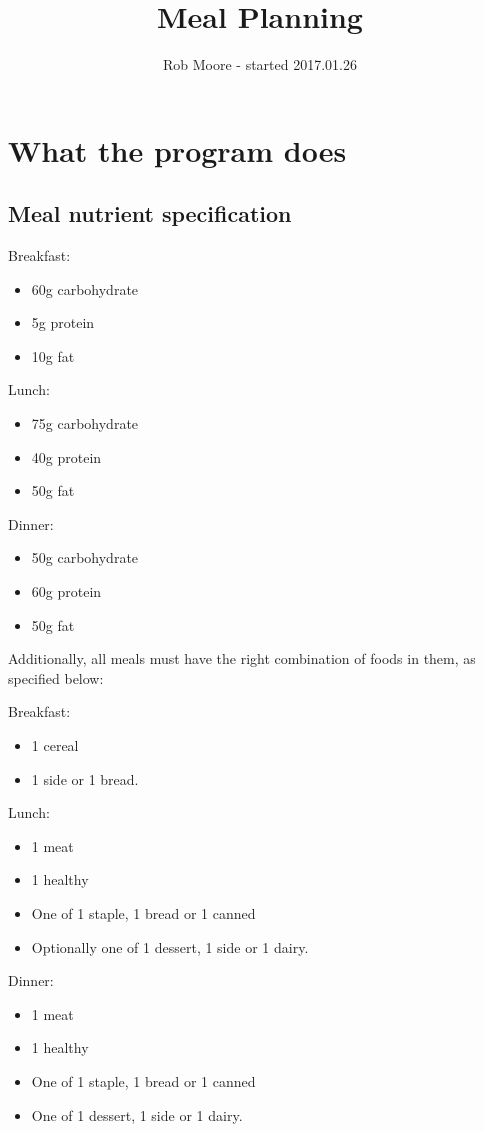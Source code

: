 \documentclass[a4paper]{article}
\title{Meal Planning}
\author{Rob Moore - started 2017.01.26}
\begin{document}
\maketitle

\section{What the program does}

\subsection{Meal nutrient specification}

Breakfast:
\begin{itemize}
  \item 60g carbohydrate
  \item 5g protein
  \item 10g fat
\end{itemize}

Lunch:
\begin{itemize}
  \item 75g carbohydrate
  \item 40g protein
  \item 50g fat
\end{itemize}

Dinner:
\begin{itemize}
  \item 50g carbohydrate
  \item 60g protein
  \item 50g fat
\end{itemize}

Additionally, all meals must have the right combination of foods in them, as 
specified below:


Breakfast:
\begin{itemize}
  \item 1 cereal 
  \item 1 side or 1 bread.
\end{itemize}

Lunch:
\begin{itemize}
  \item 1 meat
  \item 1 healthy
  \item One of 1 staple, 1 bread or 1 canned 
  \item Optionally one of 1 dessert, 1 side or 1 dairy.
\end{itemize}

Dinner:
\begin{itemize}
  \item 1 meat
  \item 1 healthy
  \item One of 1 staple, 1 bread or 1 canned 
  \item One of 1 dessert, 1 side or 1 dairy.
\end{itemize}
\end{document}
